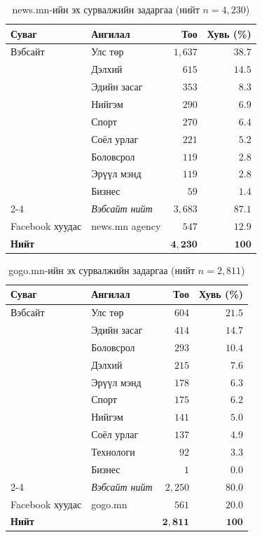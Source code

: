 \begin{table}[H]
\centering
\caption{news.mn-ийн эх сурвалжийн задаргаа (нийт $n=4{,}230$)}
\label{tab:newscat}
\begin{tabular}{@{}llrr@{}}
\toprule
\textbf{Суваг} & \textbf{Ангилал} & \textbf{Тоо} & \textbf{Хувь (\%)} \\
\midrule
Вэбсайт & Улс төр      & $1{,}637$ & $38.7$ \\
         & Дэлхий       & $615$     & $14.5$ \\
         & Эдийн засаг  & $353$     & $8.3$  \\
         & Нийгэм       & $290$     & $6.9$  \\
         & Спорт        & $270$     & $6.4$  \\
         & Соёл урлаг   & $221$     & $5.2$  \\
         & Боловсрол    & $119$     & $2.8$  \\
         & Эрүүл мэнд  & $119$     & $2.8$  \\
         & Бизнес       & $59$      & $1.4$  \\
\cmidrule(l){2-4}
         & \textit{Вэбсайт нийт} & $3{,}683$ & $87.1$ \\
\midrule
Facebook хуудас & news.mn agency & $547$ & $12.9$ \\
\midrule
\textbf{Нийт} & & $\mathbf{4{,}230}$ & $\mathbf{100}$ \\
\bottomrule
\end{tabular}
\end{table}

\begin{table}[H]
\centering
\caption{gogo.mn-ийн эх сурвалжийн задаргаа (нийт $n=2{,}811$)}
\label{tab:gogocat}
\begin{tabular}{@{}llrr@{}}
\toprule
\textbf{Суваг} & \textbf{Ангилал} & \textbf{Тоо} & \textbf{Хувь (\%)} \\
\midrule
Вэбсайт & Улс төр      & $604$ & $21.5$ \\
         & Эдийн засаг  & $414$ & $14.7$ \\
         & Боловсрол    & $293$ & $10.4$ \\
         & Дэлхий       & $215$ & $7.6$  \\
         & Эрүүл мэнд  & $178$ & $6.3$  \\
         & Спорт        & $175$ & $6.2$  \\
         & Нийгэм       & $141$ & $5.0$  \\
         & Соёл урлаг   & $137$ & $4.9$  \\
         & Технологи    & $92$  & $3.3$  \\
         & Бизнес       & $1$   & $0.0$  \\
\cmidrule(l){2-4}
         & \textit{Вэбсайт нийт} & $2{,}250$ & $80.0$ \\
\midrule
Facebook хуудас & gogo.mn & $561$ & $20.0$ \\
\midrule
\textbf{Нийт} & & $\mathbf{2{,}811}$ & $\mathbf{100}$ \\
\bottomrule
\end{tabular}
\end{table}

